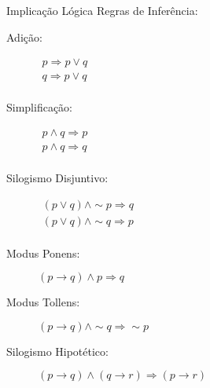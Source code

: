 \begin{frame}[t]{Implicação Lógica} %
	Regras de Inferência:
	\begin{description}
	\item[Adição:] 
		$\begin{array}{l}
		   p \Rightarrow p \vee q \\ 
		   q \Rightarrow p \vee q \\
		\end{array}$

	\item[Simplificação:] 
		$\begin{array}{l}
		  p \wedge q \Rightarrow p \\
		  p \wedge q \Rightarrow q \\
		\end{array}$

	\item[Silogismo Disjuntivo:] 
		$\begin{array}{l}
		  (p \vee q) \wedge \sim p \Rightarrow q \\
		  (p \vee q) \wedge \sim q \Rightarrow p \\
		\end{array}$

	\item[Modus Ponens:] $ (p \rightarrow q) \wedge p \Rightarrow q$

	\item[Modus Tollens:] $ (p \rightarrow q) \wedge \sim q \Rightarrow \sim p$

	\item[Silogismo Hipotético:] $ (p \rightarrow q) \wedge  (q \rightarrow r) \Rightarrow  (p \rightarrow r)$

	\end{description}
\end{frame}

